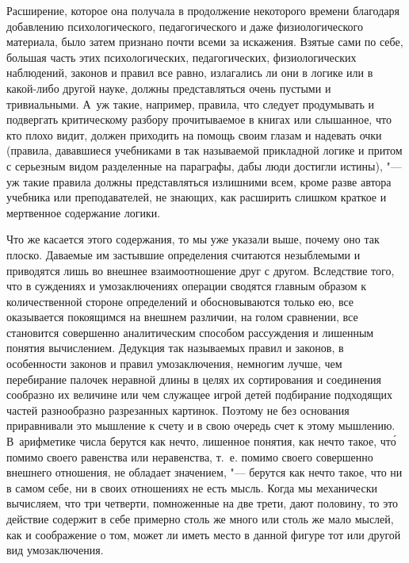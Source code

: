 Расширение, которое она получала в продолжение некоторого времени благодаря
добавлению психологического, педагогического и даже физиологического
материала, было затем признано почти всеми за искажения. Взятые сами по
себе, большая часть этих психологических, педагогических, физиологических
наблюдений, законов и правил все равно, излагались ли они в логике или в
какой-либо другой науке, должны представляться очень пустыми и
тривиальными. А~уж такие, например, правила, что следует продумывать и
подвергать критическому разбору прочитываемое в книгах или слышанное, что
кто плохо видит, должен приходить на помощь своим глазам и надевать очки
(правила, дававшиеся учебниками в так называемой прикладной логике и притом
с серьезным видом разделенные на параграфы, дабы люди достигли истины), "---
уж такие правила должны представляться излишними всем, кроме разве автора
учебника или преподавателей, не знающих, как расширить слишком краткое и
мертвенное содержание логики.

Что же касается этого содержания, то мы уже указали выше, почему оно так
плоско. Даваемые им застывшие определения считаются незыблемыми и
приводятся лишь во внешнее взаимоотношение друг с другом. Вследствие того,
что в суждениях и умозаключениях операции сводятся главным образом к
количественной стороне определений и обосновываются только ею, все
оказывается покоящимся на внешнем различии, на голом сравнении, все
становится совершенно аналитическим способом рассуждения и лишенным понятия
вычислением. Дедукция так называемых правил и законов, в особенности
законов и правил умозаключения, немногим лучше, чем перебирание палочек
неравной длины в целях их сортирования и соединения сообразно их величине
или чем служащее игрой детей подбирание подходящих частей разнообразно
разрезанных картинок. Поэтому не без основания приравнивали это мышление к
счету и в свою очередь счет к этому мышлению. В~арифметике числа берутся
как нечто, лишенное понятия, как нечто такое, чт\'{о} помимо своего равенства
или неравенства, т.~е. помимо своего совершенно внешнего отношения, не
обладает значением, "--- берутся как нечто такое, что ни в самом себе, ни в
своих отношениях не есть мысль. Когда мы механически вычисляем, что три
четверти, помноженные на две трети, дают половину, то это действие содержит
в себе примерно столь же много или столь же мало мыслей, как и соображение
о том, может ли иметь место в данной фигуре тот или другой вид умозаключения.

